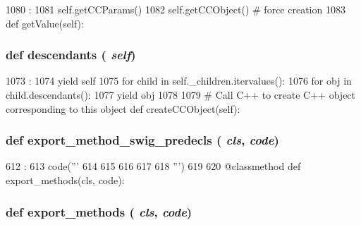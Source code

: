 \begin{DoxyCode}
1080                             :
1081         self.getCCParams()
1082         self.getCCObject() # force creation
1083 
    def getValue(self):
\end{DoxyCode}
\hypertarget{classm5_1_1SimObject_1_1SimObject_acf2e57325b000a537cce1d359185f734}{
\subsubsection[{descendants}]{\setlength{\rightskip}{0pt plus 5cm}def descendants ( {\em self})}}
\label{classm5_1_1SimObject_1_1SimObject_acf2e57325b000a537cce1d359185f734}



\begin{DoxyCode}
1073                          :
1074         yield self
1075         for child in self._children.itervalues():
1076             for obj in child.descendants():
1077                 yield obj
1078 
1079     # Call C++ to create C++ object corresponding to this object
    def createCCObject(self):
\end{DoxyCode}
\hypertarget{classm5_1_1SimObject_1_1SimObject_ac19f60f4d41b7b37c7f282db24e5d743}{
\subsubsection[{export\_\-method\_\-swig\_\-predecls}]{\setlength{\rightskip}{0pt plus 5cm}def export\_\-method\_\-swig\_\-predecls ( {\em cls}, \/   {\em code})}}
\label{classm5_1_1SimObject_1_1SimObject_ac19f60f4d41b7b37c7f282db24e5d743}



\begin{DoxyCode}
612                                               :
613         code('''
614 %
615 
616 %
617 %
618 ''')
619 
620     @classmethod
    def export_methods(cls, code):
\end{DoxyCode}
\hypertarget{classm5_1_1SimObject_1_1SimObject_ab373c5eaef9a7b80491a097389260f4a}{
\subsubsection[{export\_\-methods}]{\setlength{\rightskip}{0pt plus 5cm}def export\_\-methods ( {\em cls}, \/   {\em code})}}
\label{classm5_1_1SimObject_1_1SimObject_ab373c5eaef9a7b80491a097389260f4a}




